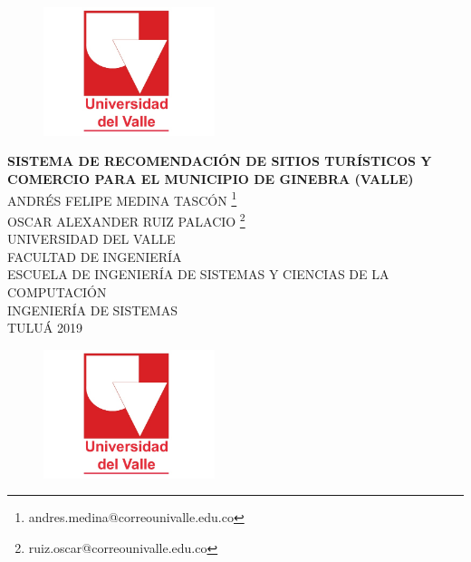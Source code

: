 \documentclass[12pt,letterpaper,openany]{book}
\date{}
\begin{document}
\fancyhead[RO,LE]{}

\begin{titlepage}

\begin{center}

\begin{figure}[htb]
\begin{center}
\includegraphics[width=5cm]{./imagenes/logo}
\end{center}
\end{figure}

\textbf{SISTEMA DE RECOMENDACIÓN DE SITIOS TURÍSTICOS Y COMERCIO PARA EL MUNICIPIO DE GINEBRA (VALLE)} \\

\vspace*{1.5in}
ANDRÉS FELIPE MEDINA TASCÓN \footnote{andres.medina@correounivalle.edu.co}\\
OSCAR ALEXANDER RUIZ PALACIO \footnote{ruiz.oscar@correounivalle.edu.co}\\

\vspace*{1.5in}
UNIVERSIDAD DEL VALLE\\
FACULTAD DE INGENIERÍA\\
ESCUELA DE INGENIERÍA DE SISTEMAS Y CIENCIAS DE LA COMPUTACIÓN\\
INGENIERÍA DE SISTEMAS\\
TULUÁ
2019

\end{center}

\vspace*{1.6in}
\begin{center}

\begin{figure}[htb]
\begin{center}
\includegraphics[width=5cm]{./imagenes/logo}
\end{center}
\end{figure}


\end{center}
\end{titlepage}
\end{document}
